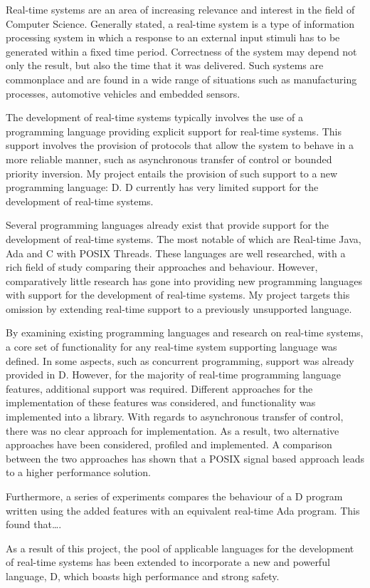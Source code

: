 
Real-time systems are an area of increasing relevance and interest in the field 
of Computer Science. Generally stated, a real-time system is a type of information 
processing system in which a response to an external input stimuli 
has to be generated within a fixed time period. Correctness of the 
system may depend not only the result, but also the time that it was delivered. 
Such systems are commonplace and are found in a wide range of 
situations such as manufacturing processes, automotive vehicles and embedded 
sensors.
\par\bigskip\noindent
The development of real-time systems typically involves the use of a programming 
language providing explicit support for real-time systems. 
This support involves the provision of protocols that allow the system to 
behave in a more reliable manner, such as asynchronous transfer of control or 
bounded priority inversion. 
My project entails the provision of such support to a new programming language: 
D. D currently has very limited support for the development of real-time systems. 
\par\bigskip\noindent
Several programming languages already exist that provide support for the 
development of real-time systems. The most notable of which are 
Real-time Java, Ada and C with POSIX Threads. These languages are well researched, 
with a rich field of study comparing their approaches and behaviour. 
However, comparatively little research has gone into providing new programming 
languages with support for the development of real-time systems. My project 
targets this omission by extending real-time support to a previously unsupported 
language.
\par\bigskip\noindent
By examining existing programming languages and research on real-time systems, a core set 
of functionality for any real-time system supporting language was defined. 
In some aspects, such as concurrent programming, support was already provided in D. 
However, for the majority of real-time programming language features,
additional support was required. Different approaches for the implementation 
of these features was considered, and functionality was implemented into 
a library. With regards to asynchronous transfer of control, there was no clear 
approach for implementation. As a result, two alternative approaches have 
been considered, profiled and implemented. A comparison between the two approaches 
has shown that a POSIX signal based approach leads to a higher performance 
solution. 
\par\bigskip\noindent
Furthermore, a series of experiments compares the behaviour of a D program written 
using the added features with an equivalent real-time Ada program. This found 
that\ldots. 
\par\bigskip\noindent
As a result of this project, the pool of applicable languages for the development 
of real-time systems has been extended to incorporate a new and powerful language, D, which 
boasts high performance and strong safety. 


